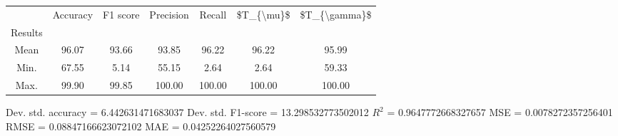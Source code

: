 \begin{tabular}{|c|c|c|c|c|c|c|}
\toprule
{} &  Accuracy &  F1 score &  Precision &  Recall &  \$T\_\{\textbackslash mu\}\$ &  \$T\_\{\textbackslash gamma\}\$ \\
Results &           &           &            &         &            &               \\
\hline
Mean    &     96.07 &     93.66 &      93.85 &   96.22 &      96.22 &         95.99 \\
Min.    &     67.55 &      5.14 &      55.15 &    2.64 &       2.64 &         59.33 \\
Max.    &     99.90 &     99.85 &     100.00 &  100.00 &     100.00 &        100.00 \\
\bottomrule
\end{tabular}

 Dev. std. accuracy = 6.442631471683037
 Dev. std. F1-score = 13.298532773502012
 $R^2$ = 0.9647772668327657
 MSE = 0.0078272357256401
 RMSE = 0.08847166623072102
 MAE = 0.04252264027560579